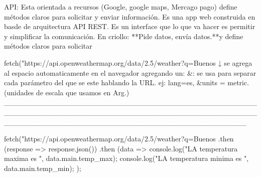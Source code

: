 
API:
Esta orientada a recursos (Google, google maps, Mercago pago) define métodos claros para solicitar y enviar información.
Es una app web construida en basde de arquitectura {API REST}.
Es un interface que lo que va hacer es permitir y simplificar la comunicación.
En criollo:    **Pide datos, envía datos.**y define métodos claros para solicitar

fetch("https://api.openweathermap.org/data/2.5/weather?q=Buenos%
                                                              ↓
se agrega al espacio automaticamente en el navegador agregando un: %
&: se usa para separar cada parámetro del que se este hablando la URL. ej: lang=es, &units = metric.   (unidades de escala que usamos en Arg.)
______________________________________________________________________________________________________________________________________________

fetch("https://api.openweathermap.org/data/2.5/weather?q=Buenos%
.then (response => response.json()) 
.then (data => {
    console.log("LA temperatura maxima es ", data.main.temp_max);
    console.log("LA temperatura minima es ", data.main.temp_min);
});
